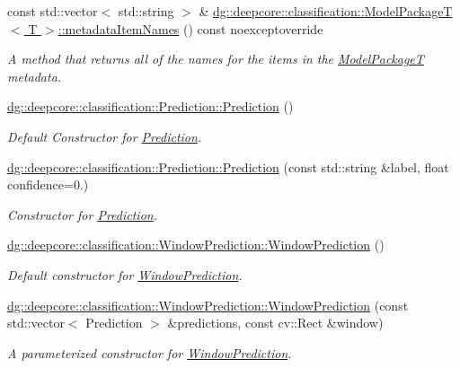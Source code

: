 \begin{DoxyCompactItemize}
const std\+::vector$<$ std\+::string $>$ \& \hyperlink{group___classification_module_gae205ffc25753f735f7e0d0fa64cd4162}{dg\+::deepcore\+::classification\+::\+Model\+Package\+T$<$ T $>$\+::metadata\+Item\+Names} () const noexceptoverride
\begin{DoxyCompactList}\small\item\em A method that returns all of the names for the items in the \hyperlink{classdg_1_1deepcore_1_1classification_1_1_model_package_t}{Model\+PackageT} metadata. \end{DoxyCompactList}\item 
\hyperlink{group___classification_module_gab393a5d0a2ff4d9ba72801a7d450a140}{dg\+::deepcore\+::classification\+::\+Prediction\+::\+Prediction} ()
\begin{DoxyCompactList}\small\item\em Default Constructor for \hyperlink{structdg_1_1deepcore_1_1classification_1_1_prediction}{Prediction}. \end{DoxyCompactList}\item 
\hyperlink{group___classification_module_ga4656207fb44b596eaf90bb5613f6f9aa}{dg\+::deepcore\+::classification\+::\+Prediction\+::\+Prediction} (const std\+::string \&label, float confidence=0.)
\begin{DoxyCompactList}\small\item\em Constructor for \hyperlink{structdg_1_1deepcore_1_1classification_1_1_prediction}{Prediction}. \end{DoxyCompactList}\item 
\hyperlink{group___classification_module_ga6337a86649fa61f2b4e122a35aa06bf6}{dg\+::deepcore\+::classification\+::\+Window\+Prediction\+::\+Window\+Prediction} ()
\begin{DoxyCompactList}\small\item\em Default constructor for \hyperlink{structdg_1_1deepcore_1_1classification_1_1_window_prediction}{Window\+Prediction}. \end{DoxyCompactList}\item 
\hyperlink{group___classification_module_gaa68db23c3bebd48d26ac60872a7f4f9c}{dg\+::deepcore\+::classification\+::\+Window\+Prediction\+::\+Window\+Prediction} (const std\+::vector$<$ Prediction $>$ \&predictions, const cv\+::\+Rect \&window)
\begin{DoxyCompactList}\small\item\em A parameterized constructor for \hyperlink{structdg_1_1deepcore_1_1classification_1_1_window_prediction}{Window\+Prediction}. \end{DoxyCompactList}\item 

\end{DoxyCompactItemize}
